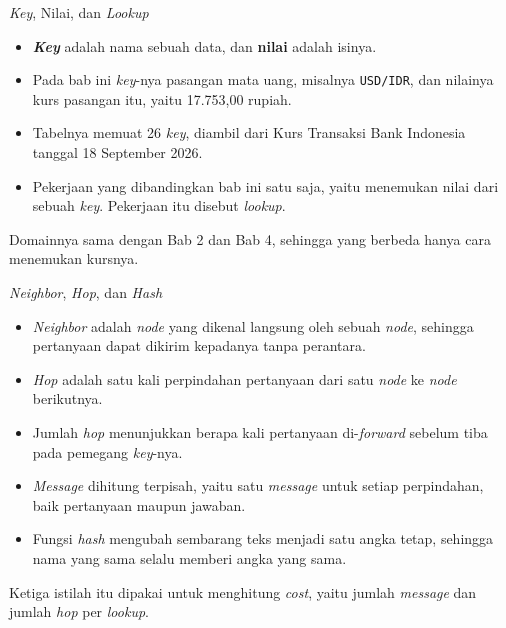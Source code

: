 \documentclass[aspectratio=169, table, 12pt]{beamer}
\begin{document}
\begin{frame}{{\Large \textit{Key}, Nilai, dan \textit{Lookup}}}
  \vspace{10pt}
  \begin{itemize}\small
    \item \textbf{\textit{Key}} adalah nama sebuah data, dan \textbf{nilai} adalah
          isinya.
    \item Pada bab ini \textit{key}-nya pasangan mata uang, misalnya
          \texttt{USD/IDR}, dan nilainya kurs pasangan itu, yaitu 17.753,00
          rupiah.
    \item Tabelnya memuat 26 \textit{key}, diambil dari Kurs Transaksi Bank Indonesia
          tanggal 18 September 2026.
    \item Pekerjaan yang dibandingkan bab ini satu saja, yaitu menemukan nilai
          dari sebuah \textit{key}. Pekerjaan itu disebut \textit{lookup}.
  \end{itemize}

  \vspace{10pt}
  {\small Domainnya sama dengan Bab 2 dan Bab 4, sehingga yang berbeda hanya
  cara menemukan kursnya.}
\end{frame}

\begin{frame}{{\Large \textit{Neighbor}, \textit{Hop}, dan \textit{Hash}}}
  \vspace{10pt}
  \begin{itemize}\small
    \item \textit{Neighbor} adalah \textit{node} yang dikenal langsung oleh
          sebuah \textit{node}, sehingga pertanyaan dapat dikirim kepadanya
          tanpa perantara.
    \item \textit{Hop} adalah satu kali perpindahan pertanyaan dari satu
          \textit{node} ke \textit{node} berikutnya.
    \item Jumlah \textit{hop} menunjukkan berapa kali pertanyaan di-\textit{forward}
          sebelum tiba pada pemegang \textit{key}-nya.
    \item \textit{Message} dihitung terpisah, yaitu satu \textit{message} untuk setiap perpindahan,
          baik pertanyaan maupun jawaban.
    \item Fungsi \textit{hash} mengubah sembarang teks menjadi satu angka
          tetap, sehingga nama yang sama selalu memberi angka yang sama.
  \end{itemize}

  \vspace{10pt}
  {\small Ketiga istilah itu dipakai untuk menghitung \textit{cost}, yaitu jumlah \textit{message}
  dan jumlah \textit{hop} per \textit{lookup}.}
\end{frame}
\end{document}
